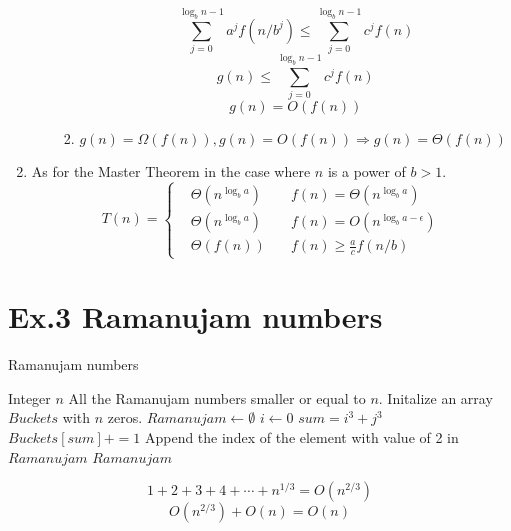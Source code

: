 \documentclass[a4paper]{article}
\begin{document}
\begin{enumerate}[1.]
\begin{enumerate}[a)]
\begin{enumerate}[i - ]
				$$\sum_{j=0}^{\log_bn-1}a^jf(n/b^j)\leq \sum_{j=0}^{\log_bn-1}c^jf(n)$$
				$$g(n)\leq\sum_{j=0}^{\log_bn-1}c^jf(n)$$
				$$g(n)=O(f(n))$$
				\item $g(n)=\Omega(f(n)), g(n)=O(f(n)) \Rightarrow g(n)=\Theta(f(n))$
			\end{enumerate}
		\end{enumerate}
		\item As for the Master Theorem in the case where $n$ is a power of $b>1$.
		$$ T(n) = \left\{
		\begin{aligned}
			&\Theta(n^{\log_ba})\quad &f(n)=\Theta(n^{\log_ba})\\
			&\Theta(n^{\log_ba})&f(n)=O(n^{\log_ba-\epsilon})\\
			&\Theta(f(n))\quad&f(n)\geq \frac{a}{c}f(n/b)
		\end{aligned}\right.
		$$
	\end{enumerate}

\section*{Ex.3 Ramanujam numbers}
	\begin{algorithm}
		\caption{Ramanujam numbers}
		\begin{algorithmic}[1]
			\Require Integer $n$
			\Ensure All the Ramanujam numbers smaller or equal to $n$.
			\State Initalize an array $Buckets$ with $n$ zeros.
			\State $Ramanujam\leftarrow\emptyset$
			\State $i\leftarrow0$
					\State $sum = i^3 + j^3$
						\State $Buckets[sum]+=1$
					\EndIf
				\EndFor
			\EndFor
				\State Append the index of the element with value of 2 in $Ramanujam$
			\EndFor
			\State \Return $Ramanujam$
		\end{algorithmic}
	\end{algorithm}
	$$1+2+3+4+\cdots+n^{1/3}=O(n^{2/3})$$
	$$O(n^{2/3})+O(n)=O(n)$$
\end{document}

